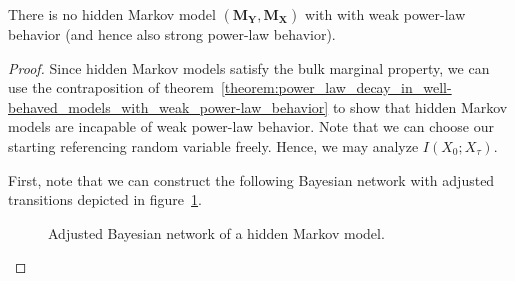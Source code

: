 \documentclass[../../main.tex]{subfiles}
\begin{document}
    \begin{theorem}
        \label{theorem:no_hidden_markov_model_with_power-law}
        There is no hidden Markov model $(\bm{M_Y}, \bm{M_X})$ with with weak power-law behavior (and hence also strong power-law behavior).
    \end{theorem}
    \vspace{-2.5em}
    \begin{proof}
        Since hidden Markov models satisfy the bulk marginal property, we can use the contraposition of theorem~\ref{theorem:power_law_decay_in_well-behaved_models_with_weak_power-law_behavior} to show that hidden Markov models are incapable of weak power-law behavior. Note that we can choose our starting referencing random variable freely. Hence, we may analyze $I(X_0; X_{\tau})$.

        First, note that we can construct the following Bayesian network with adjusted transitions depicted in figure~\ref{fig:adjusted_bayesian_network_hidden_markov}.

        \begin{figure}[h]
            \center
            \caption{Adjusted Bayesian network of a hidden Markov model.}
            \label{fig:adjusted_bayesian_network_hidden_markov}
        \end{figure}


\end{proof}
\end{document}
